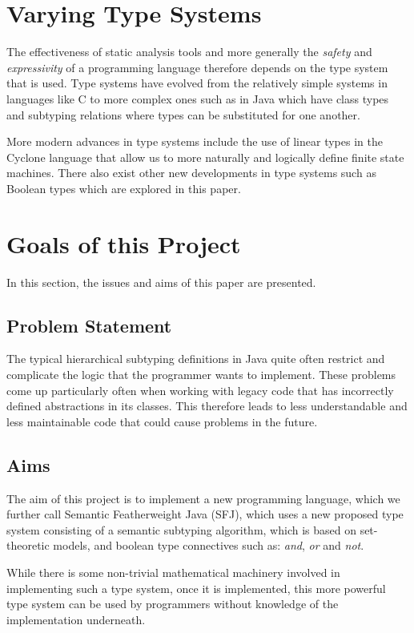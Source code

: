 \documentclass{l4proj}
\begin{document}
\section{Varying Type Systems}

The effectiveness of static analysis tools and more generally the \emph{safety} and \emph{expressivity} of a programming language therefore depends on the type system that is used.
Type systems have evolved from the relatively simple systems in languages like C to more complex ones such as in Java which have class types and subtyping relations where types can be substituted for one another.

More modern advances in type systems include the use of linear types in the Cyclone \citep{grossman2002} language that allow us to more naturally and logically define finite state machines.
There also exist other new developments in type systems such as Boolean types which are explored in this paper.

\section{Goals of this Project}

In this section, the issues and aims of this paper are presented.

\subsection{Problem Statement}

The typical hierarchical subtyping definitions in Java quite often restrict and complicate the logic that the programmer wants to implement.
These problems come up particularly often when working with legacy code that has incorrectly defined abstractions in its classes.
This therefore leads to less understandable and less maintainable code that could cause problems in the future.

\subsection{Aims}

The aim of this project is to implement a new programming language, which we further call Semantic Featherweight Java (SFJ), which uses a new proposed type system consisting of a semantic subtyping algorithm, which is based on set-theoretic models, and boolean type connectives such as: \emph{and}, \emph{or} and \emph{not}.

While there is some non-trivial mathematical machinery involved in implementing such a type system, once it is implemented, this more powerful type system can be used by programmers without knowledge of the implementation underneath.
\end{document}

